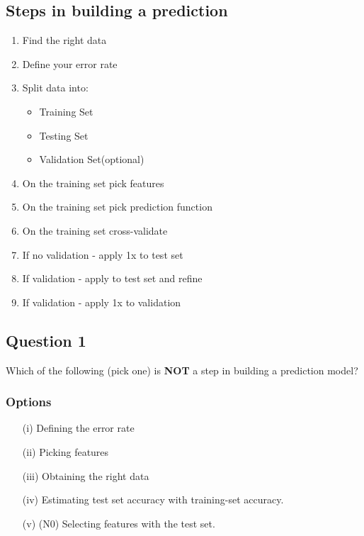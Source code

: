 \documentclass[12pt]{article}
\begin{document}
\subsection*{Steps in building a prediction}
\begin{enumerate}
\item Find the right data
\item Define your error rate
\item Split data into:
\begin{itemize}
\item Training Set
\item Testing Set
\item Validation Set(optional)
\end{itemize}
\item On the training set pick features
\item On the training set pick prediction function
\item On the training set cross-validate

\item If no validation - apply 1x to test set
\item If validation - apply to test set and refine
\item If validation - apply 1x to validation
\end{enumerate}
\subsection*{Question 1}
Which of the following (pick one) is \textbf{NOT} a step in building a prediction model?
\subsubsection*{Options}
\begin{itemize}
\item[(i)] Defining the error rate			
\item[(ii)] Picking features			
\item[(iii)] Obtaining the right data			
\item[(iv)] Estimating test set accuracy with training-set accuracy. 
\item[(v)] (N0) Selecting features with the test set.
\end{itemize} 
\newpage
\end{document}
